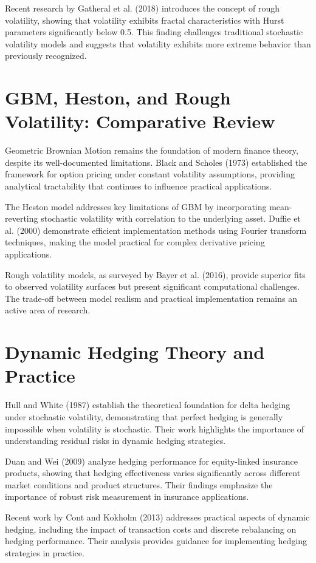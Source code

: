 \documentclass[12pt,a4paper]{report}
\begin{document}
Recent research by Gatheral et al. (2018) introduces the concept of rough volatility, showing that volatility exhibits fractal characteristics with Hurst parameters significantly below 0.5. This finding challenges traditional stochastic volatility models and suggests that volatility exhibits more extreme behavior than previously recognized.

\section{GBM, Heston, and Rough Volatility: Comparative Review}

Geometric Brownian Motion remains the foundation of modern finance theory, despite its well-documented limitations. Black and Scholes (1973) established the framework for option pricing under constant volatility assumptions, providing analytical tractability that continues to influence practical applications.

The Heston model addresses key limitations of GBM by incorporating mean-reverting stochastic volatility with correlation to the underlying asset. Duffie et al. (2000) demonstrate efficient implementation methods using Fourier transform techniques, making the model practical for complex derivative pricing applications.

Rough volatility models, as surveyed by Bayer et al. (2016), provide superior fits to observed volatility surfaces but present significant computational challenges. The trade-off between model realism and practical implementation remains an active area of research.

\section{Dynamic Hedging Theory and Practice}

Hull and White (1987) establish the theoretical foundation for delta hedging under stochastic volatility, demonstrating that perfect hedging is generally impossible when volatility is stochastic. Their work highlights the importance of understanding residual risks in dynamic hedging strategies.

Duan and Wei (2009) analyze hedging performance for equity-linked insurance products, showing that hedging effectiveness varies significantly across different market conditions and product structures. Their findings emphasize the importance of robust risk measurement in insurance applications.

Recent work by Cont and Kokholm (2013) addresses practical aspects of dynamic hedging, including the impact of transaction costs and discrete rebalancing on hedging performance. Their analysis provides guidance for implementing hedging strategies in practice.
\end{document}
